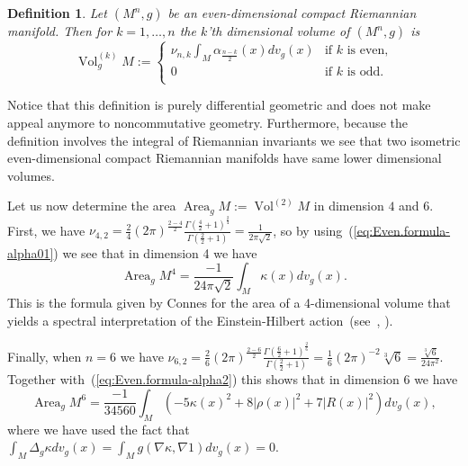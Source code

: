 \documentclass[leqno, 10pt]{amsart}
\newtheorem{definition}{Definition}[section]
\theoremstyle{remark}
\begin{document}
\begin{definition}\label{def:Even.general-def}
Let $(M^{n},g)$ be an even-dimensional compact Riemannian manifold.  
Then for $k=1,\ldots,n$ the $k$'th dimensional volume of $(M^{n},g)$ is
\begin{equation}
     {{\operatorname{{Vol}}}}^{(k)}_{g}M:=\left\{
     \begin{array}{ll}
         \nu_{n,k}\int_{M}\alpha_{\frac{n-k}{2}}(x)dv_{g}(x) &  \text{if $k$ is even,}\\
               0 & \text{if $k$ is odd.}\\
     \end{array} \right.
\end{equation}
\end{definition}

Notice that this definition is purely differential geometric and does not make appeal anymore to noncommutative geometry. Furthermore, because the 
definition involves the integral of Riemannian invariants we see that two isometric even-dimensional compact Riemannian manifolds have same lower 
dimensional volumes. 

Let us now determine the area  ${\operatorname{{Area}}}_{g}M:={{\operatorname{{Vol}}}}^{(2)}M$ in dimension $4$ and $6$. 
First, we have 
$\nu_{4,2}=\frac{2}{4}(2\pi)^{\frac{2-4}{2}}\frac{\Gamma(\frac{4}{2}+1)^{\frac{2}{4}}}{\Gamma(\frac{2}{2}+1)}= \frac{1}{2\pi \sqrt{2}}$, so by 
using~(\ref{eq:Even.formula-alpha01}) we see that in dimension 4 we have
    \begin{equation}
        {\operatorname{{Area}}}_{g}M^{4}=\frac{-1}{24 \pi \sqrt{2}}\int_{M} \kappa(x)dv_{g}(x).
         \label{eq:NCG.area4}
    \end{equation}
This is the formula given by Connes for the area of a 4-dimensional volume that yields a spectral interpretation of the 
Einstein-Hilbert action~(see~\cite{KW:GNGWR}, \cite{Ka:DOG}).

Finally, when $n=6$ we have 
$\nu_{6,2}=\frac{2}{6}(2\pi)^{\frac{2-6}{2}}\frac{\Gamma(\frac{6}{2}+1)^{\frac{2}{6}}}{\Gamma(\frac{2}{2}+1)}= 
    \frac{1}{6}(2\pi)^{-2}\sqrt[3]{6}=\frac{\sqrt[3]{6}}{24\pi^{2}}$.
Together with~(\ref{eq:Even.formula-alpha2}) this shows that in dimension 6 we have 
\begin{equation}
    {\operatorname{{Area}}}_{g}M^{6}= \frac{-1}{34560}\int_{M}(-5\kappa(x)^{2}+8|\rho(x)|^{2}+7|R(x)|^{2})dv_{g}(x),
    \label{eq:Even.Area-6}
\end{equation}
where we have used the fact that $\int_{M}\Delta_{g}\kappa dv_{g}(x)=\int_{M}g(\nabla \kappa,\nabla 1)dv_{g}(x)=0$.  
\end{document}
